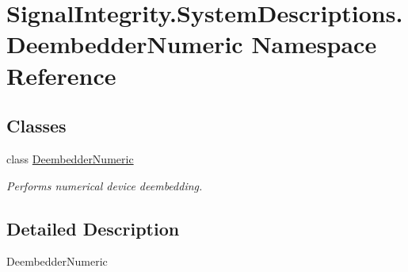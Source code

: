\hypertarget{namespaceSignalIntegrity_1_1SystemDescriptions_1_1DeembedderNumeric}{}\section{Signal\+Integrity.\+System\+Descriptions.\+Deembedder\+Numeric Namespace Reference}
\label{namespaceSignalIntegrity_1_1SystemDescriptions_1_1DeembedderNumeric}
\subsection*{Classes}
\begin{DoxyCompactItemize}
\item 
class \hyperlink{classSignalIntegrity_1_1SystemDescriptions_1_1DeembedderNumeric_1_1DeembedderNumeric}{Deembedder\+Numeric}
\begin{DoxyCompactList}\small\item\em Performs numerical device deembedding. \end{DoxyCompactList}\end{DoxyCompactItemize}


\subsection{Detailed Description}
\begin{DoxyVerb}DeembedderNumeric\end{DoxyVerb}
 